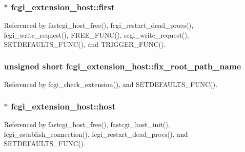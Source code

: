 \hypertarget{structfcgi__extension__host_abb8dfa6d141106454e5f09ae9abc9a84}{
\subsubsection[{first}]{$\ast$ fcgi\-\_\-extension\-\_\-host\-::first}}\label{structfcgi__extension__host_abb8dfa6d141106454e5f09ae9abc9a84}


Referenced by fastcgi\-\_\-host\-\_\-free(), fcgi\-\_\-restart\-\_\-dead\-\_\-procs(), fcgi\-\_\-write\-\_\-request(), F\-R\-E\-E\-\_\-\-F\-U\-N\-C(), scgi\-\_\-write\-\_\-request(), S\-E\-T\-D\-E\-F\-A\-U\-L\-T\-S\-\_\-\-F\-U\-N\-C(), and T\-R\-I\-G\-G\-E\-R\-\_\-\-F\-U\-N\-C().

\hypertarget{structfcgi__extension__host_a07b4d2b5802995d2dbc56e324d50dc1a}{
\subsubsection[{fix\-\_\-root\-\_\-path\-\_\-name}]{\setlength{\rightskip}{0pt plus 5cm}unsigned short fcgi\-\_\-extension\-\_\-host\-::fix\-\_\-root\-\_\-path\-\_\-name}}\label{structfcgi__extension__host_a07b4d2b5802995d2dbc56e324d50dc1a}


Referenced by fcgi\-\_\-check\-\_\-extension(), and S\-E\-T\-D\-E\-F\-A\-U\-L\-T\-S\-\_\-\-F\-U\-N\-C().

\hypertarget{structfcgi__extension__host_a48f3e193249fa8a3bd6492ebc965c393}{
\subsubsection[{host}]{$\ast$ fcgi\-\_\-extension\-\_\-host\-::host}}\label{structfcgi__extension__host_a48f3e193249fa8a3bd6492ebc965c393}


Referenced by fastcgi\-\_\-host\-\_\-free(), fastcgi\-\_\-host\-\_\-init(), fcgi\-\_\-establish\-\_\-connection(), fcgi\-\_\-restart\-\_\-dead\-\_\-procs(), and S\-E\-T\-D\-E\-F\-A\-U\-L\-T\-S\-\_\-\-F\-U\-N\-C().

